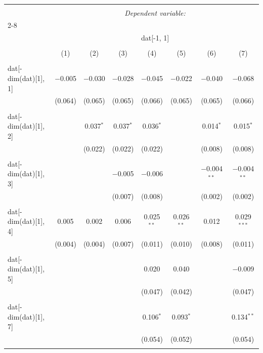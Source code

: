 
\begin{table}[!htbp] \centering 
  \caption{} 
  \label{} 
\begin{tabular}{@{\extracolsep{5pt}}lccccccc} 
\\[-1.8ex]\hline 
\hline \\[-1.8ex] 
 & \multicolumn{7}{c}{\textit{Dependent variable:}} \\ 
\cline{2-8} 
\\[-1.8ex] & \multicolumn{7}{c}{dat[-1, 1]} \\ 
\\[-1.8ex] & (1) & (2) & (3) & (4) & (5) & (6) & (7)\\ 
\hline \\[-1.8ex] 
 dat[-dim(dat)[1], 1] & $-$0.005 & $-$0.030 & $-$0.028 & $-$0.045 & $-$0.022 & $-$0.040 & $-$0.068 \\ 
  & (0.064) & (0.065) & (0.065) & (0.066) & (0.065) & (0.065) & (0.066) \\ 
  & & & & & & & \\ 
 dat[-dim(dat)[1], 2] &  & 0.037$^{*}$ & 0.037$^{*}$ & 0.036$^{*}$ &  & 0.014$^{*}$ & 0.015$^{*}$ \\ 
  &  & (0.022) & (0.022) & (0.022) &  & (0.008) & (0.008) \\ 
  & & & & & & & \\ 
 dat[-dim(dat)[1], 3] &  &  & $-$0.005 & $-$0.006 &  & $-$0.004$^{**}$ & $-$0.004$^{**}$ \\ 
  &  &  & (0.007) & (0.008) &  & (0.002) & (0.002) \\ 
  & & & & & & & \\ 
 dat[-dim(dat)[1], 4] & 0.005 & 0.002 & 0.006 & 0.025$^{**}$ & 0.026$^{**}$ & 0.012 & 0.029$^{***}$ \\ 
  & (0.004) & (0.004) & (0.007) & (0.011) & (0.010) & (0.008) & (0.011) \\ 
  & & & & & & & \\ 
 dat[-dim(dat)[1], 5] &  &  &  & 0.020 & 0.040 &  & $-$0.009 \\ 
  &  &  &  & (0.047) & (0.042) &  & (0.047) \\ 
  & & & & & & & \\ 
 dat[-dim(dat)[1], 7] &  &  &  & 0.106$^{*}$ & 0.093$^{*}$ &  & 0.134$^{**}$ \\ 
  &  &  &  & (0.054) & (0.052) &  & (0.054) \\ 
  & & & & & & & \\ 

\end{tabular}
\end{table}
